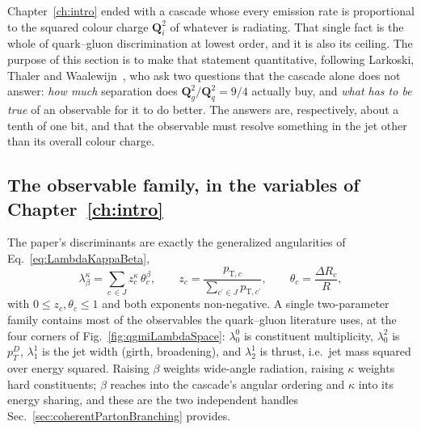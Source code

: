 Chapter~\ref{ch:intro} ended with a cascade whose every emission rate is
proportional to the squared colour charge \(\mathbf{Q}_i^2\) of whatever is
radiating. That single fact is the whole of quark--gluon discrimination at lowest
order, and it is also its ceiling. The purpose of this section is to make that
statement quantitative, following Larkoski, Thaler and
Waalewijn~\cite{Larkoski_2014}, who ask two questions that the cascade alone does
not answer: \emph{how much} separation does \(\mathbf{Q}_g^2/\mathbf{Q}_q^2=9/4\)
actually buy, and \emph{what has to be true} of an observable for it to do better.
The answers are, respectively, about a tenth of one bit, and that the observable
must resolve something in the jet other than its overall colour charge.

\subsection{The observable family, in the variables of Chapter~\ref{ch:intro}}
\label{subsec:qgmiFamily}

The paper's discriminants are exactly the generalized angularities of
Eq.~\ref{eq:LambdaKappaBeta},
\begin{equation}
	\lambda^\kappa_\beta = \sum_{c\,\in J} z_c^\kappa\,\theta_c^\beta ,
	\qquad
	z_c = \frac{p_{\mathrm{T},c}}{\sum_{c^\prime\in J}p_{\mathrm{T},c^\prime}} ,
	\qquad
	\theta_c = \frac{\Delta R_{c}}{R} ,
	\label{eq:qgmiAngularity}
\end{equation}
with \(0\le z_c,\theta_c\le1\) and both exponents non-negative. A single
two-parameter family contains most of the observables the quark--gluon literature
uses, at the four corners of Fig.~\ref{fig:qgmiLambdaSpace}: \(\lambda^0_0\) is
constituent multiplicity, \(\lambda^2_0\) is \(p_T^D\), \(\lambda^1_1\) is the jet
width (girth, broadening), and \(\lambda^1_2\) is thrust, i.e.\ jet mass squared
over energy squared. Raising \(\beta\) weights wide-angle radiation, raising
\(\kappa\) weights hard constituents; \(\beta\) reaches into the cascade's angular
ordering and \(\kappa\) into its energy sharing, and these are the two independent
handles Sec.~\ref{sec:coherentPartonBranching} provides.

